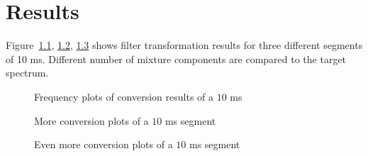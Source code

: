 \chapter{Results} %
\label{cha:results}
Figure~\ref{fig:frequency_plots_1}, \ref{fig:frequency_plots_2}, \ref{fig:frequency_plots_3} shows filter transformation results for three different segments of 10 ms. Different number of mixture components are compared to the target spectrum.
\begin{figure}[htbp]
	\begin{center}
	\caption{Frequency plots of conversion results of a $10$ ms}
	\label{fig:frequency_plots_1}
	\end{center}
\end{figure}

\begin{figure}[htbp]
	\begin{center}
	\caption{More conversion plots of a $10$ ms segment}
	\label{fig:frequency_plots_2}
	\end{center}
\end{figure}

\begin{figure}[htbp]
	\begin{center}
	\caption{Even more conversion plots of a $10$ ms segment}
	\label{fig:frequency_plots_3}
	\end{center}
\end{figure}

